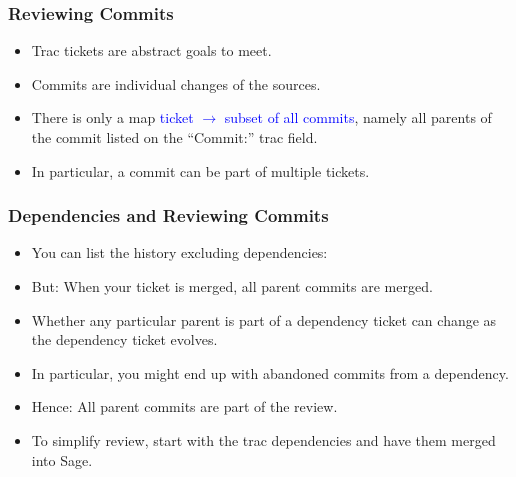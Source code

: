 \begin{frame}
  \frametitle{Reviewing Commits}

  \begin{itemize}
  \item<1-> Trac tickets are abstract goals to meet.
  \item<2-> Commits are individual changes of the sources.
  \item<3-> There is only a map \textcolor{blue}{ticket $\to$ subset of
      all commits}, namely all parents of the commit listed on the
    ``Commit:'' trac field.
  \item<4-> In particular, a commit can be part of multiple tickets.
  \end{itemize}

\end{frame}


\begin{frame}
  \frametitle{Dependencies and Reviewing Commits}

  \begin{itemize}
  \item<1->
    You can list the history excluding dependencies:\\
  \item<2-> But: When your ticket is merged, all parent commits are
    merged.
  \item<3-> Whether any particular parent is part of a dependency ticket
    can change as the dependency ticket evolves.
  \item<4-> In particular, you might end up with abandoned commits from a
    dependency.
  \item<5-> Hence: All parent commits are part of the review. 
  \item<6-> To simplify review, start with the trac dependencies and have
    them merged into Sage.
  \end{itemize}
\end{frame}





